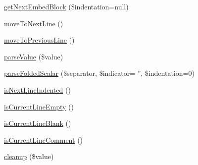 \begin{DoxyCompactItemize}
\item 
\hyperlink{class_symfony_1_1_components_1_1_yaml_1_1_parser_a094d72cd70df641bbb7c4d87647e7afe}{getNextEmbedBlock} (\$indentation=null)
\item 
\hyperlink{class_symfony_1_1_components_1_1_yaml_1_1_parser_a23295181488f2269374ba055ab73f133}{moveToNextLine} ()
\item 
\hyperlink{class_symfony_1_1_components_1_1_yaml_1_1_parser_a793efbbdb80289712c6d8b13974a0794}{moveToPreviousLine} ()
\item 
\hyperlink{class_symfony_1_1_components_1_1_yaml_1_1_parser_a090d97f0d830c8a3a6d4962636b9081b}{parseValue} (\$value)
\item 
\hyperlink{class_symfony_1_1_components_1_1_yaml_1_1_parser_aca51709db86f3336fa0cd8773cc791d0}{parseFoldedScalar} (\$separator, \$indicator= '', \$indentation=0)
\item 
\hyperlink{class_symfony_1_1_components_1_1_yaml_1_1_parser_a007cdf42dc438be788d23206f14e7396}{isNextLineIndented} ()
\item 
\hyperlink{class_symfony_1_1_components_1_1_yaml_1_1_parser_ae7bb7c2fd370a72c6f119b53ee64eb82}{isCurrentLineEmpty} ()
\item 
\hyperlink{class_symfony_1_1_components_1_1_yaml_1_1_parser_a071146be0626e2ff9537f3b741b511d6}{isCurrentLineBlank} ()
\item 
\hyperlink{class_symfony_1_1_components_1_1_yaml_1_1_parser_af9c00798454b2a4b7c360c3bba9f6b10}{isCurrentLineComment} ()
\item 
\hyperlink{class_symfony_1_1_components_1_1_yaml_1_1_parser_a6d462f56da02d7670e368941d918f074}{cleanup} (\$value)
\end{DoxyCompactItemize}
